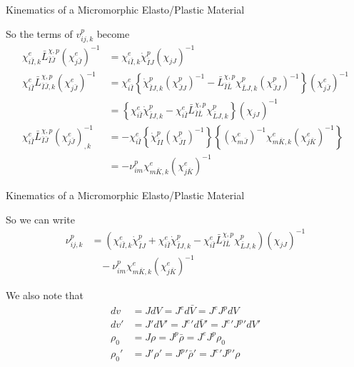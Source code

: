 \documentclass[11pt]{beamer}
\begin{document}
\begin{frame}{Kinematics of a Micromorphic Elasto/Plastic Material}

So the terms of $v_{ij,k}^p$ become
\begin{align*}
\chi_{i\bar{I},k}^e \bar{L}_{\bar{I}\bar{J}}^{\chi,p} \left(\chi_{j\bar{J}}^e\right)^{-1} &= \chi_{i\bar{I},k}^e \dot{\chi}_{\bar{I}J}^p \left(\chi_{jJ}\right)^{-1}\\
\chi_{i\bar{I}}^e \bar{L}_{\bar{I}\bar{J},k}^{\chi,p}\left(\chi_{j\bar{J}}^e\right)^{-1} &= \chi_{i\bar{I}}^e \left\{\dot{\chi}_{\bar{I}J,k}^p \left(\chi_{\bar{J} J}^p\right)^{-1} - \bar{L}_{\bar{I}\bar{L}}^{\chi,p}\chi_{\bar{L}J,k}^p \left(\chi_{\bar{J}J}^p\right)^{-1}\right\}\left(\chi_{j\bar{J}}^e\right)^{-1}\\
&=  \left\{\chi_{i\bar{I}}^e\dot{\chi}_{\bar{I}J,k}^p - \chi_{i\bar{I}}^e\bar{L}_{\bar{I}\bar{L}}^{\chi,p}\chi_{\bar{L}J,k}^p \right\}\left(\chi_{j J}\right)^{-1}\\
\chi_{i\bar{I}}^e \bar{L}_{\bar{I}\bar{J}}^{\chi,p} \left(\chi_{j\bar{J}}^e\right)_{,k}^{-1} &= -\chi_{i\bar{I}}^e \left\{ \dot{\chi}_{\bar{I}I}^p\left(\chi_{\bar{J} I}^p\right)^{-1} \right\}\left\{ \left(\chi_{m\bar{J}}^e\right)^{-1} \chi_{m\bar{K},k}^e\left(\chi_{j\bar{K}}^e\right)^{-1} \right\}\\
&= -\nu_{im}^p \chi_{m\bar{K},k}^e\left(\chi_{j\bar{K}}^e\right)^{-1}
\end{align*}

\end{frame}

\begin{frame}{Kinematics of a Micromorphic Elasto/Plastic Material}

So we can write
\begin{align*}
\nu_{ij,k}^p &= \left(\chi_{i\bar{I},k}^e \dot{\chi}_{\bar{I}J}^p + \chi_{i\bar{I}}^e\dot{\chi}_{\bar{I}J,k}^p - \chi_{i\bar{I}}^e\bar{L}_{\bar{I}\bar{L}}^{\chi,p}\chi_{\bar{L}J,k}^p\right)\left(\chi_{jJ}\right)^{-1}\\
&\ \ \ \ -\nu_{im}^p \chi_{m\bar{K},k}^e\left(\chi_{j\bar{K}}^e\right)^{-1}
\end{align*}

We also note that
\begin{align*}
dv &= J dV = J^e d\bar{V} = J^e J^p dV\\
dv' &= J' dV' = {J^e}' d\bar{V}' = {J^e}' {J^p}' dV'\\
\rho_0 &= J \rho = J^p \bar{\rho} = J^e J^p \rho_0\\
\rho_0' &= J' \rho' = {J^p}' \bar{\rho}' = {J^e}' {J^p}' \rho\\
\end{align*}

\end{frame}
\end{document}
